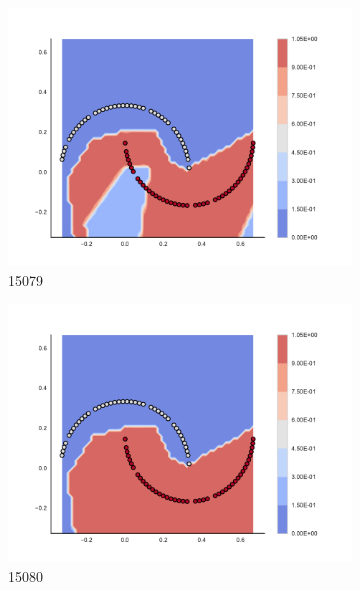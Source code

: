 \begin{figure}[h]
\begin{subfigure}[b]{0.09\textwidth}
    \includegraphics[clip, trim=2.35cm 1.75cm 4.5cm 0cm,width=\textwidth]{img/convergence/15079.pdf}
    \caption{15079}
    \label{fig:convergence_15079}
\end{subfigure}
%
\begin{subfigure}[b]{0.09\textwidth}
    \includegraphics[clip, trim=2.35cm 1.75cm 4.5cm 0cm,width=\textwidth]{img/convergence/15080.pdf}
    \caption{15080}
    \label{fig:convergence_15080}
\end{subfigure}
%
\begin{subfigure}[b]{0.09\textwidth}

\end{subfigure}
\end{figure}
